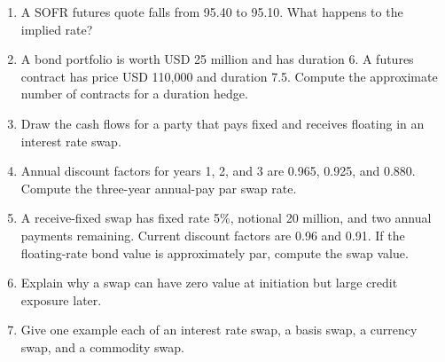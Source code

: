 \begin{enumerate}
    \item A SOFR futures quote falls from 95.40 to 95.10. What happens to the
    implied rate?
    \item A bond portfolio is worth USD 25 million and has duration 6. A futures
    contract has price USD 110,000 and duration 7.5. Compute the approximate
    number of contracts for a duration hedge.
    \item Draw the cash flows for a party that pays fixed and receives floating
    in an interest rate swap.
    \item Annual discount factors for years 1, 2, and 3 are 0.965, 0.925, and
    0.880. Compute the three-year annual-pay par swap rate.
    \item A receive-fixed swap has fixed rate 5\%, notional 20 million, and two
    annual payments remaining. Current discount factors are 0.96 and 0.91. If
    the floating-rate bond value is approximately par, compute the swap value.
    \item Explain why a swap can have zero value at initiation but large credit
    exposure later.
    \item Give one example each of an interest rate swap, a basis swap, a
    currency swap, and a commodity swap.
\end{enumerate}



